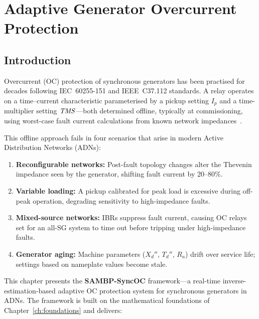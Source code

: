 \chapter{Adaptive Generator Overcurrent Protection}
\label{ch:generator_oc}

\section{Introduction}
\label{sec:ch5_intro}

Overcurrent (OC) protection of synchronous generators has been practised
for decades following IEC~60255-151 and IEEE~C37.112 standards. A relay
operates on a time--current characteristic parameterised by a pickup setting
$I_p$ and a time-multiplier setting $\mathit{TMS}$---both determined offline,
typically at commissioning, using worst-case fault current calculations
from known network impedances~\citep{Blackburn2006}.

This offline approach fails in four scenarios that arise in modern Active
Distribution Networks (ADNs):
\begin{enumerate}
\item \textbf{Reconfigurable networks:} Post-fault topology changes alter
      the Thevenin impedance seen by the generator, shifting fault current
      by 20--80\%.
\item \textbf{Variable loading:} A pickup calibrated for peak load is
      excessive during off-peak operation, degrading sensitivity to
      high-impedance faults.
\item \textbf{Mixed-source networks:} IBRs suppress fault current,
      causing OC relays set for an all-SG system to time out before
      tripping under high-impedance faults.
\item \textbf{Generator aging:} Machine parameters ($X_d''$, $T_d''$, $R_a$)
      drift over service life; settings based on nameplate values become stale.
\end{enumerate}

This chapter presents the \textbf{SAMBP-SyncOC} framework---a real-time
inverse-estimation-based adaptive OC protection system for synchronous
generators in ADNs. The framework is built on the mathematical foundations
of Chapter~\ref{ch:foundations} and delivers:

